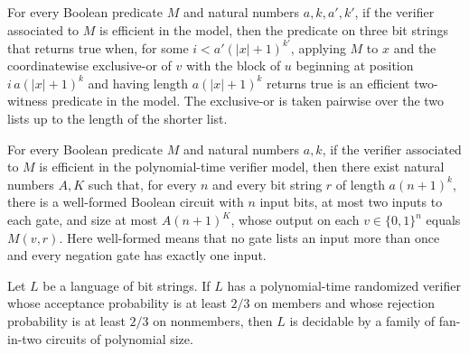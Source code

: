 \begin{theorem}
\label{Randomized.polyTimeModel_closedUnderShiftOr}
\leanok
{}
For every Boolean predicate $M$ and natural numbers $a,k,a',k'$, if the verifier
associated to $M$ is efficient in the model, then the predicate on three bit strings
that returns true when, for some $i<a'(|x|+1)^{k'}$, applying $M$ to $x$ and the
coordinatewise exclusive-or of $v$ with the block of $u$ beginning at position
$i\,a(|x|+1)^k$ and having length $a(|x|+1)^k$ returns true is an efficient two-witness
predicate in the model. The exclusive-or is taken pairwise over the two lists up to the
length of the shorter list.
\end{theorem}

\begin{theorem}
\label{Randomized.polyTimeModel_verifierHasCircuits}
\leanok
{}
For every Boolean predicate $M$ and natural numbers $a,k$, if the verifier associated to
$M$ is efficient in the polynomial-time verifier model, then there exist natural numbers
$A,K$ such that, for every $n$ and every bit string $r$ of length $a(n+1)^k$, there is a
well-formed Boolean circuit with $n$ input bits, at most two inputs to each gate, and
size at most $A(n+1)^K$, whose output on each $v\in\{0,1\}^n$ equals $M(v,r)$. Here
well-formed means that no gate lists an input more than once and every negation gate has
exactly one input.
\end{theorem}

\begin{theorem}
\label{Randomized.adleman_polyTime}
\leanok
{}
Let $L$ be a language of bit strings. If $L$ has a polynomial-time randomized verifier
whose acceptance probability is at least $2/3$ on members and whose rejection
probability is at least $2/3$ on nonmembers, then $L$ is decidable by a family of
fan-in-two circuits of polynomial size.
\end{theorem}

